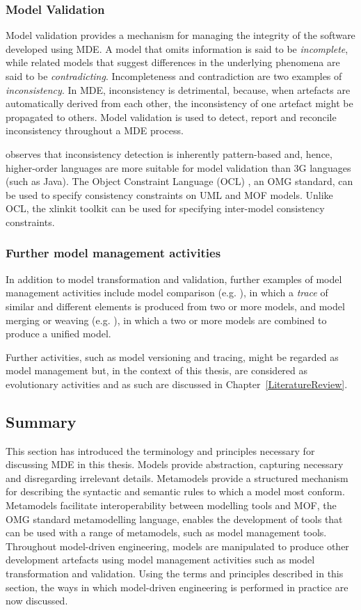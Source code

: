 \subsubsection{Model Validation}
Model validation provides a mechanism for managing the integrity of the software developed using MDE. A model that omits information is said to be \emph{incomplete}, while related models that suggest differences in the underlying phenomena are said to be \emph{contradicting}. Incompleteness and contradiction are two examples of \emph{inconsistency}. In MDE, inconsistency is detrimental, because, when artefacts are automatically derived from each other, the inconsistency of one artefact might be propagated to others. Model validation is used to detect, report and reconcile inconsistency throughout a MDE process.

\cite{kolovos09thesis} observes that inconsistency detection is inherently pattern-based and, hence, higher-order languages are more suitable for model validation than 3G languages (such as Java). The Object Constraint Language (OCL) \cite{ocl2}, an OMG standard, can be used to specify consistency constraints on UML and MOF models. Unlike OCL, the xlinkit toolkit \cite{nentwich2003flexible} can be used for specifying inter-model consistency constraints. 

\subsubsection{Further model management activities}
In addition to model transformation and validation, further examples of model management activities include model comparison (e.g. \cite{kolovos06ecl}), in which a \emph{trace} of similar and different elements is produced from two or more models, and model merging or weaving (e.g. \cite{kolovos07eml}), in which a two or more models are combined to produce a unified model.

Further activities, such as model versioning and tracing, might be regarded as model management but, in the context of this thesis, are considered as evolutionary activities and as such are discussed in Chapter~\ref{LiteratureReview}.

\subsection{Summary}
This section has introduced the terminology and principles necessary for discussing MDE in this thesis. Models provide abstraction, capturing necessary and disregarding irrelevant details. Metamodels provide a structured mechanism for describing the syntactic and semantic rules to which a model most conform. Metamodels facilitate interoperability between modelling tools and MOF, the OMG standard metamodelling language, enables the development of tools that can be used with a range of metamodels, such as model management tools. Throughout model-driven engineering, models are manipulated to produce other development artefacts using model management activities such as model transformation and validation. Using the terms and principles described in this section, the ways in which model-driven engineering is performed in practice are now discussed.